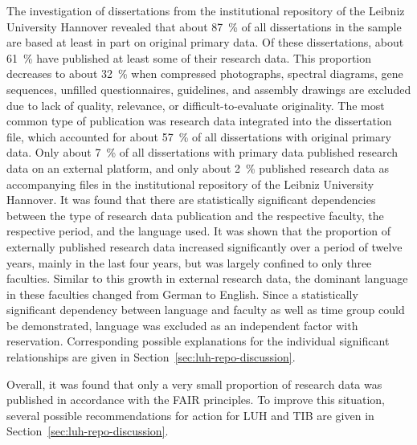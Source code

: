 The investigation of dissertations from the institutional repository of the Leibniz University Hannover revealed that about \SI{87}{\percent} of all dissertations in the sample are based at least in part on original primary data.
Of these dissertations, about \SI{61}{\percent} have published at least some of their research data.
This proportion decreases to about \SI{32}{\percent} when compressed photographs, spectral diagrams, gene sequences, unfilled questionnaires, guidelines, and assembly drawings are excluded due to lack of quality, relevance, or difficult-to-evaluate originality.
The most common type of publication was research data integrated into the dissertation file, which accounted for about \SI{57}{\percent} of all dissertations with original primary data.
Only about \SI{7}{\percent} of all dissertations with primary data published research data on an external platform, and only about \SI{2}{\percent} published research data as accompanying files in the institutional repository of the Leibniz University Hannover.
It was found that there are statistically significant dependencies between the type of research data publication and the respective faculty, the respective period, and the language used.
It was shown that the proportion of externally published research data increased significantly over a period of twelve years, mainly in the last four years, but was largely confined to only three faculties.
Similar to this growth in external research data, the dominant language in these faculties changed from German to English.
Since a statistically significant dependency between language and faculty as well as time group could be demonstrated, language was excluded as an independent factor with reservation.
Corresponding possible explanations for the individual significant relationships are given in Section~\ref{sec:luh-repo-discussion}.

Overall, it was found that only a very small proportion of research data was published in accordance with the FAIR principles.
To improve this situation, several possible recommendations for action for LUH and TIB are given in Section~\ref{sec:luh-repo-discussion}.